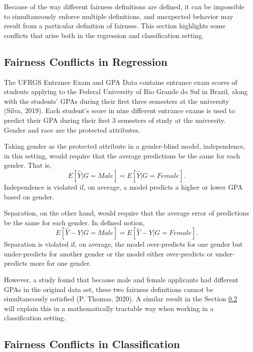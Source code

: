 \documentclass[12pt, twoside]{amherstthesis}
\begin{document}
Because of the way different fairness definitions are defined, it can be impossible to simultaneously enforce multiple definitions, and unexpected behavior may result from a particular definition of fairness. This section highlights some conflicts that arise both in the regression and classification setting.

\hypertarget{fairness-conflicts-in-regression}{%
\subsection{Fairness Conflicts in Regression}\label{fairness-conflicts-in-regression}}

The UFRGS Entrance Exam and GPA Data contains entrance exam scores of students applying to the Federal University of Rio Grande do Sul in Brazil, along with the students' GPAs during their first three semesters at the university (Silva, 2019). Each student's score in nine different entrance exams is used to predict their GPA during their first 3 semesters of study at the university. Gender and race are the protected attributes.

Taking gender as the protected attribute in a gender-blind model, independence, in this setting, would require that the average predictions be the same for each gender. That is,
\begin{equation}
\label{ch1eq12}
E[\hat{Y} | G = Male] = E[\hat{Y} | G = Female].
\end{equation}
Independence is violated if, on average, a model predicts a higher or lower GPA based on gender.

Separation, on the other hand, would require that the average error of predictions be the same for each gender. In defined notion,
\begin{equation}
\label{ch1eq13}
E[\hat{Y} - Y | G = Male] = E[\hat{Y} - Y| G = Female].
\end{equation}
Separation is violated if, on average, the model over-predicts for one gender but under-predicts for another gender or the model either over-predicts or under-predicts more for one gender.

However, a study found that because male and female applicants had different GPAs in the original data set, these two fairness definitions cannot be simultaneously satisfied (P. Thomas, 2020). A similar result in the Section \ref{class-conflict} will explain this in a mathematically tractable way when working in a classification setting.

\hypertarget{class-conflict}{%
\subsection{Fairness Conflicts in Classification}\label{class-conflict}}
\end{document}
